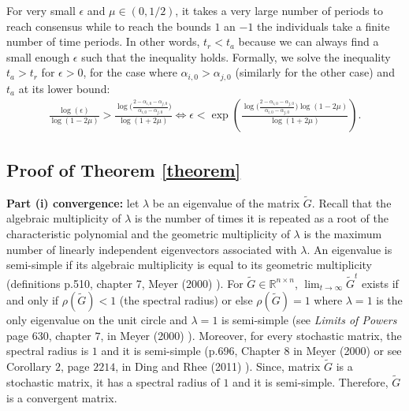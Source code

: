 \documentclass{article}
\begin{document}
\noindent For very small $\epsilon$ and $\mu \in (0,1/2)$, it takes a very large number of periods to reach consensus while to reach the bounds $1$ an $-1$ the individuals take a finite number of time periods. In other words, $t_r < t_a$ because we can always find a small enough $\epsilon$ such that the inequality holds. Formally, we solve the  inequality $t_a > t_r$ for $\epsilon >0$, for the case where $\alpha_{i,0}>\alpha_{j,0}$ (similarly for the other case) and $t_a$ at its lower bound: 
\begin{align*}
 \frac{\log (\epsilon)}{\log(1 - 2\mu)} > \frac{ \log \big( \frac{2 - \alpha_{i,0} - \alpha_{j,0}}{\alpha_{i,0} - \alpha_{j,0} } \big) }{\log(1+2\mu)} 
\Leftrightarrow  \epsilon < \exp ( \frac{ \log \big( \frac{2 - \alpha_{i,0} - \alpha_{j,0}}{\alpha_{i,0} - \alpha_{j,0} } \big) \log (1-2\mu)}{\log(1+2\mu)}).
\end{align*}






\subsection{Proof of Theorem \ref{theorem}} \label{prooftheorem}

{\bf Part (i) convergence:} let $\lambda$ be an eigenvalue of the matrix $\tilde{G}$. Recall that the algebraic multiplicity of $\lambda$ is the number of times it is repeated as a root of the characteristic polynomial and the geometric multiplicity of $\lambda$ is the maximum number of linearly independent eigenvectors associated with $\lambda$. An eigenvalue is semi-simple if its algebraic multiplicity is equal to its geometric multiplicity (definitions p.510, chapter 7, Meyer (2000) \cite{meyer}). For $\tilde{G} \in \mathbb{R}^{n \times n}$, $\lim_{t \rightarrow \infty} \tilde{G}^t$ exists if and only if $\rho(\tilde{G})<1$ (the spectral radius) or else $\rho(\tilde{G}) =1$ where $\lambda=1$ is the only eigenvalue on the unit circle and $\lambda=1$ is semi-simple (see \textit{Limits of Powers} page $630$, chapter $7$, in Meyer (2000) \cite{meyer}). Moreover, for every stochastic matrix, the spectral radius is $1$ and it is semi-simple (p.696, Chapter 8 in Meyer (2000) \cite{meyer} or see Corollary $2$, page $2214$, in Ding and Rhee (2011) \cite{dingrhee}). Since, matrix $\tilde{G}$ is a stochastic matrix, it has a spectral radius of $1$ and it is semi-simple. Therefore, $\tilde{G}$ is a convergent matrix. %
\bigskip
\end{document}
